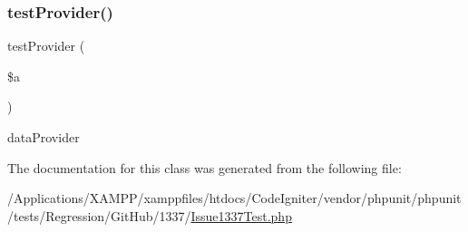 \mbox{\label{class_issue1337_test_a46d45f40c248127cf9b04386050b8fe6}} 
\subsubsection{\texorpdfstring{test\+Provider()}{testProvider()}}
{\footnotesize\ttfamily test\+Provider (\begin{DoxyParamCaption}\item[{}]{\$a }\end{DoxyParamCaption})}

data\+Provider 

The documentation for this class was generated from the following file\+:\begin{DoxyCompactItemize}
\item 
/\+Applications/\+X\+A\+M\+P\+P/xamppfiles/htdocs/\+Code\+Igniter/vendor/phpunit/phpunit/tests/\+Regression/\+Git\+Hub/1337/\mbox{\hyperlink{_issue1337_test_8php}{Issue1337\+Test.\+php}}\end{DoxyCompactItemize}
